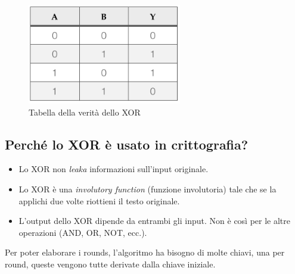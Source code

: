 \begin{figure}[H]
	\centering
	\includegraphics[width=0.6\textwidth, height=0.6\textheight, keepaspectratio]{./images/XOR/XOR-Truth-Table.png}
	\caption{Tabella della verità dello XOR}
	\label{fig:xor_truth_table}
\end{figure}

\subsection{Perché lo XOR è usato in crittografia?}

\begin{itemize}
	\item \textsf{\small Lo XOR non \emph{leaka} informazioni sull'input originale.} %
	\item \textsf{\small Lo XOR è una \emph{involutory function} (funzione involutoria) tale che se la applichi due volte riottieni il testo originale.}
	\item \textsf{\small L'output dello XOR dipende da entrambi gli input. Non è così per le altre operazioni (AND, OR, NOT, ecc.).}
\end{itemize}

\fleuron


\textsf{\small Per poter elaborare i rounds, l'algoritmo ha bisogno di molte chiavi, una per round, queste vengono tutte derivate dalla chiave iniziale.}


